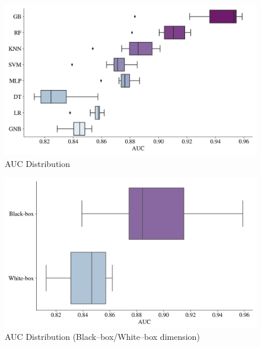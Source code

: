 \begin{figure}[H]
    \centering
    \caption{AUC Distribution}\vspace{0.5em}
    \label{fig:aucdist}
    \includegraphics[width=140mm]{Figures/AUC_Distribution.jpg}
    
    \vspace{-1em}
\end{figure}

\begin{figure}[H]
    \centering
    \caption{AUC Distribution (Black--box/White--box dimension)}\vspace{0.5em}
    \label{fig:aucdistbbwb}
    \includegraphics[width=140mm]{Figures/AUC_Distribution_BB_WB.jpg}
    
    \vspace{-1em}
\end{figure}

